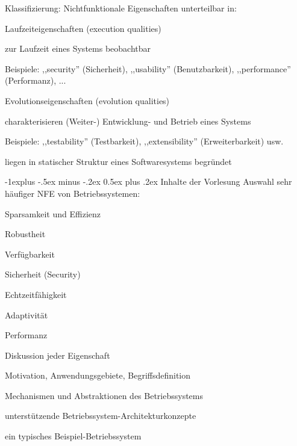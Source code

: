 \documentclass[a4paper]{article}
\makeatletter
\renewcommand{\subsection}{\@startsection{subsection}{2}{0mm}%
 {-1explus -.5ex minus -.2ex}%
 {0.5ex plus .2ex}%
 {\normalfont\normalsize\bfseries}}
\makeatother
\begin{document}
\begin{multicols}{3}
    Klassifizierung: Nichtfunktionale Eigenschaften unterteilbar in:
    \begin{enumerate*}
        \item Laufzeiteigenschaften (execution qualities)
        \begin{itemize*}
            \item zur Laufzeit eines Systems beobachtbar
            \item Beispiele: ,,security'' (Sicherheit), ,,usability'' (Benutzbarkeit), ,,performance'' (Performanz), ...
        \end{itemize*}
        \item Evolutionseigenschaften (evolution qualities)
        \begin{itemize*}
            \item charakterisieren (Weiter-) Entwicklung- und Betrieb eines Systems
            \item Beispiele: ,,testability'' (Testbarkeit), ,,extensibility'' (Erweiterbarkeit) usw.
        \end{itemize*}
        \item liegen in statischer Struktur eines Softwaresystems begründet
    \end{enumerate*}

    \subsection{Inhalte der Vorlesung}
    Auswahl sehr häufiger NFE von Betriebssystemen:
    \begin{itemize*}
        \item Sparsamkeit und Effizienz
        \item Robustheit
        \item Verfügbarkeit
        \item Sicherheit (Security)
        \item Echtzeitfähigkeit
        \item Adaptivität
        \item Performanz
    \end{itemize*}

    Diskussion jeder Eigenschaft
    \begin{itemize*}
        \item Motivation, Anwendungsgebiete, Begriffsdefinition
        \item Mechanismen und Abstraktionen des Betriebssystems
        \item unterstützende Betriebssystem-Architekturkonzepte
        \item ein typisches Beispiel-Betriebssystem
    \end{itemize*}


\end{multicols}
\end{document}
